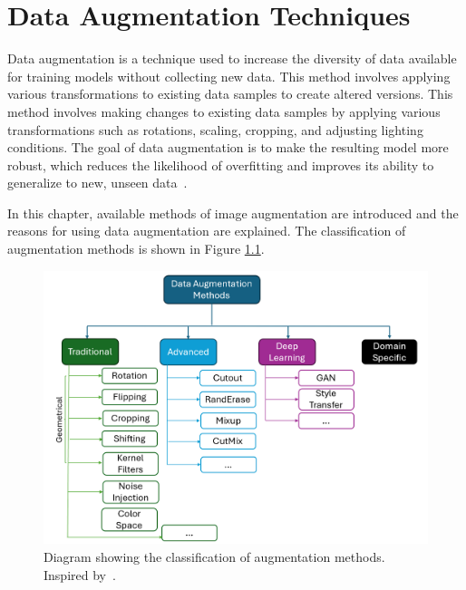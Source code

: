 \chapter{Data Augmentation Techniques}
\label{cha:overviewOfDataAugmentation}


Data augmentation is a technique used to increase the diversity of data available for training models without collecting new data. This method involves applying various transformations to existing data samples to create altered versions. This method involves making changes to existing data samples by applying various transformations such as rotations, scaling, cropping, and adjusting lighting conditions. The goal of data augmentation is to make the resulting model more robust, which reduces the likelihood of overfitting and improves its ability to generalize to new, unseen data~\cite{ImageDataAugmentationSurvey}. 

In this chapter, available methods of image augmentation are introduced and the reasons for using data augmentation are explained. The classification of augmentation methods is shown in Figure \ref{fig:augDiagram}.

\begin{figure}[!htb]
    \centering
    \includegraphics[scale=0.8]{Images/augmentation-diagram.png}
    \caption{Diagram showing the classification of augmentation methods. \\ Inspired by~\cite{AugmentationDiagram}.}
    \label{fig:augDiagram}
\end{figure}

